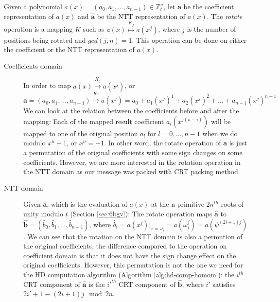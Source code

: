 Given a polynomial
\(a(x) = (a_{0}, a_{1}, \dots, a_{n-1}) \in \mathbb{Z}_{t}^{n}\), let
\(\mathbf{a}\) be the coefficient representation of \(a(x)\) and
\(\hat{\mathbf{a}}\) be the NTT representation of \(a(x)\). The \textit{rotate}
operation is a mapping \(K\) such as
\(a(x) \stackrel{K_{j}}{\mapsto} a(x^{j})\), where \(j\) is the number of
positions being rotated and \(gcd(j,n) = 1\). This operation can be done on
either the coefficient or the NTT representation of \(a(x)\).
\begin{description}
\item[Coefficients domain] In order to map
  \(a(x) \stackrel{K_{j}}{\mapsto} a(x^{j})\), or
  \[\mathbf{a} = (a_{0}, a_{1}, \dots, a_{n-1}) \stackrel{K_{j}}{\mapsto} a(x^{j}) = a_{0} + a_{1}(x^{j})^{1} + a_{2}(x^{j})^{2} + \dots + a_{n-1}(x^{j})^{n-1}\]
  We can look at the relation between the coefficients before and after the
  mapping: Each of the mapped result coefficient \(a_{i}(x^{j(n-i)})\) will be
  mapped to one of the original position \(a_{l}\) for \(l = 0,\dots,n-1\) when
  we do modulo \(x^{n} + 1\), or \(x^{n} = -1\). In other word, the rotate
  operation of \(\mathbf{a}\) is just a permutation of the original coefficients
  with some sign changes on some coefficients. However, we are more interested
  in the rotation operation in the NTT domain as our message was packed with CRT
  packing method.
\item[NTT domain] Given \(\mathbf{\hat{a}}\), which is the evaluation of
  \(a(x)\) at the n primitive \(2n^{th}\) roots of unity modulo \(t\) (Section
  \ref{sec:6bgv}):
  The rotate operation maps \(\mathbf{\hat{a}}\) to
  \(\mathbf{\hat{b}} = (\hat{b}_{0}, \hat{b}_{1}, \dots, \hat{b}_{n-1})\), where
  \(\hat{b}_{i} = a(x^{j})|_{x = \omega_{i}} = a(\omega_{i}^{j}) =
  a(\psi^{(2i+1)j})\). We can see that the rotation on the NTT domain is also a
  permution of the original coefficients, the difference compared to the
  operation on coefficient domain is that it does not have the sign change
  effect on the original coefficients. However, this permutation is not the one
  we need for the HD computation algorithm (Algorithm \ref{alg:hd-comp-homom}):
  the \(i^{th}\) CRT component of \(\mathbf{\hat{a}}\) is the \(i'^{th}\) CRT
  component of \(\mathbf{\hat{b}}\), where \(i'\) satisfies
  \(2i' +1 \equiv (2i + 1)j \mod 2n\).


\end{description}
